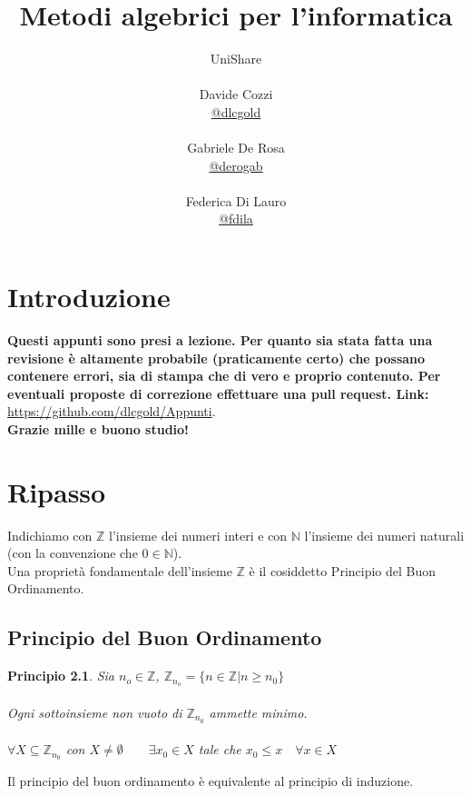 \documentclass[a4paper,12pt, oneside]{book}
\title{Metodi algebrici per l'informatica}
\author{UniShare\\\\Davide Cozzi\\\href{https://t.me/dlcgold}{@dlcgold}\\\\Gabriele De Rosa\\\href{https://t.me/derogab}{@derogab} \\\\Federica Di Lauro\\\href{https://t.me/f_dila}{@f\textunderscore dila}}
\date{}
\begin{document}
\maketitle


\newtheorem{teorema}{Teorema}
\newtheorem{definizione}{Definizione}
\newtheorem{principio}{Principio}
\newtheorem{esempio}{Esempio}
\newtheorem{corollario}{Corollario}
\newtheorem{lemma}{Lemma}
\newtheorem{osservazione}{Osservazione}
\newtheorem{nota}{Nota}
\newtheorem{algoritmo}{Algoritmo}
\tableofcontents
\renewcommand{\chaptermark}[1]{%
\markboth{\chaptername
\ \thechapter.\ #1}{}}
\renewcommand{\sectionmark}[1]{\markright{\thesection.\ #1}}

\chapter{Introduzione}
\textbf{Questi appunti sono presi a lezione. Per quanto sia stata fatta una revisione è altamente probabile (praticamente certo) che possano contenere errori, sia di stampa che di vero e proprio contenuto. Per eventuali proposte di correzione effettuare una pull request. Link: } \url{https://github.com/dlcgold/Appunti}.\\
\textbf{Grazie mille e buono studio!}

\chapter{Ripasso}
	Indichiamo con $\mathbb{Z}$ l'insieme dei numeri interi e con $\mathbb{N}$ l'insieme dei numeri naturali (con la convenzione che $0 \in \mathbb{N}$).\\
	Una proprietà fondamentale dell'insieme $\mathbb{Z}$ è il cosiddetto Principio del Buon Ordinamento.
	\section{Principio del Buon Ordinamento}
	\begin{principio}
		
		Sia $n_o \in \mathbb{Z}$, $\mathbb{Z}_{n_o} = \{n \in \mathbb{Z} | n \geq n_0\}$ \\\\
		Ogni sottoinsieme non vuoto di $\mathbb{Z}_{n_0}$ ammette minimo. \\\\
		$\forall X \subseteq \mathbb{Z}_{n_0}$ con $X \not = \emptyset \qquad \exists x_0 \in X$ tale che $x_0 \leq x \quad \forall x \in X$\\
		
	\end{principio}
	Il principio del buon ordinamento è equivalente al principio di induzione.
	
\end{document}

